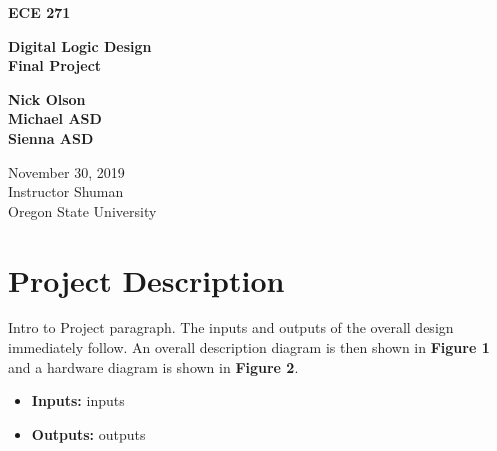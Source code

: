 \documentclass[a4paper]{article}
\begin{document}
\begin{titlepage}
 \begin{center}
  \vspace*{3cm}

  \large\textbf{ECE 271}

  \vspace{2cm}

  \huge\textbf{Digital Logic Design\\Final Project}

  \vspace{.5cm}

  \large\textbf{Nick Olson\\Michael ASD\\Sienna ASD}

  \vfill

  \normalsize November 30, 2019\\
  Instructor Shuman\\
  Oregon State University

  \vspace{0.8cm}
 \end{center}
\end{titlepage}



\tableofcontents
\listoffigures



\clearpage



\section{Project Description}
Intro to Project paragraph. The inputs and outputs of the overall design immediately follow. An overall description diagram is then shown in \textbf{Figure 1} and a hardware diagram is shown in \textbf{Figure 2}.

\begin{itemize}
  \item \textbf{Inputs:  } inputs
  \item \textbf{Outputs: } outputs
\end{itemize}
\end{document}
